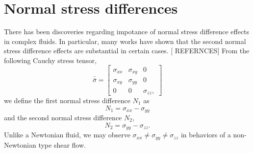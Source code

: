 \section{Normal stress differences}
There has been discoveries regarding impotance of normal stress difference effects in complex fluids. In particular, many works have shown that the second normal stress difference effects are substantial in certain cases. [{\color{blue} REFERNCES}]
From the following Cauchy stress tensor, 
\begin{equation}
  \bar{\bar{\sigma}} = 
  \begin{bmatrix}
    \sigma_{xx} & \sigma_{xy} & 0 
    \\
    \sigma_{xy} & \sigma_{yy} & 0 
    \\
    0 & 0 & \sigma_{zz},
  \end{bmatrix}
  \label{eq_cauchy_mx}
\end{equation} 
we define the first normal stress difference $N_1$ as 
\begin{equation}
  N_1 = \sigma_{xx} - \sigma_{yy}
\end{equation}
and the second normal stress difference $N_2$,
\begin{equation}
  N_2 = \sigma_{yy} - \sigma_{zz}.
\end{equation}
Unlike a Newtonian fluid, we may observe $\sigma_{xx} \neq \sigma_{yy} \neq \sigma_{zz}$ in behaviors of a non-Newtonian type shear flow.


